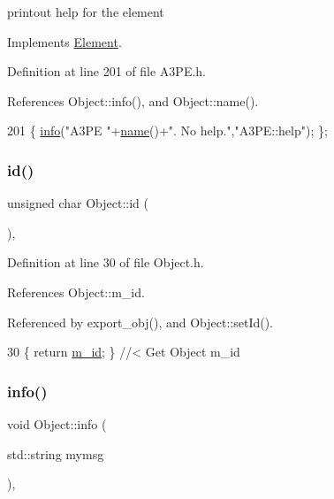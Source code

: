 printout help for the element 

Implements \hyperlink{classElement_a32c0de27acb08e17251cef88c3e9303a}{Element}.



Definition at line 201 of file A3\+P\+E.\+h.



References Object\+::info(), and Object\+::name().


\begin{DoxyCode}
201 \{ \hyperlink{classObject_a644fd329ea4cb85f54fa6846484b84a8}{info}(\textcolor{stringliteral}{"A3PE "}+\hyperlink{classObject_a300f4c05dd468c7bb8b3c968868443c1}{name}()+\textcolor{stringliteral}{". No help."},\textcolor{stringliteral}{"A3PE::help"}); \};
\end{DoxyCode}
\mbox{\label{classObject_af99145335cc61ff6e2798ea17db009d2}} 
\subsubsection{\texorpdfstring{id()}{id()}}
{\footnotesize\ttfamily unsigned char Object\+::id (\begin{DoxyParamCaption}{ }\end{DoxyParamCaption})\hspace{0.3cm}{\ttfamily [inline]}, {\ttfamily [inherited]}}



Definition at line 30 of file Object.\+h.



References Object\+::m\+\_\+id.



Referenced by export\+\_\+obj(), and Object\+::set\+Id().


\begin{DoxyCode}
30 \{ \textcolor{keywordflow}{return} \hyperlink{classObject_aca74b9dbfed7b5556ea2d56c65b6b6b0}{m\_id};         \} \textcolor{comment}{//< Get Object m\_id }
\end{DoxyCode}
\mbox{\label{classObject_a644fd329ea4cb85f54fa6846484b84a8}} 
\subsubsection{\texorpdfstring{info()}{info()}\hspace{0.1cm}{\footnotesize\ttfamily [1/2]}}
{\footnotesize\ttfamily void Object\+::info (\begin{DoxyParamCaption}\item[{std\+::string}]{mymsg }\end{DoxyParamCaption})\hspace{0.3cm}{\ttfamily [inline]}, {\ttfamily [inherited]}}



